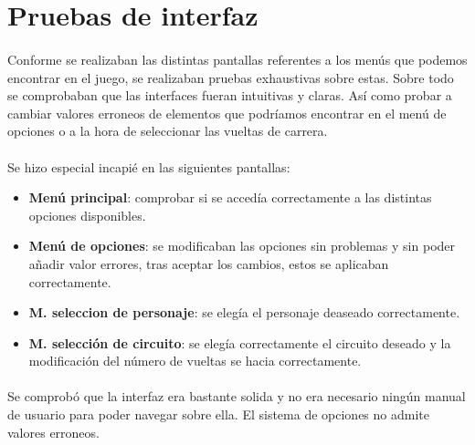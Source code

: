 \section{Pruebas de interfaz}

\paragraph{}
Conforme se realizaban las distintas pantallas referentes a los menús que podemos encontrar en el juego, se realizaban pruebas 
exhaustivas sobre estas. Sobre todo se comprobaban que las interfaces fueran intuitivas y claras. Así como probar a cambiar 
valores erroneos de elementos que podríamos encontrar en el menú de opciones o a la hora de seleccionar las vueltas de carrera.

\paragraph{}
Se hizo especial incapié en las siguientes pantallas:

\begin{itemize}
    \item \textbf{Menú principal}: comprobar si se accedía correctamente a las distintas opciones disponibles.
    
    \item \textbf{Menú de opciones}: se modificaban las opciones sin problemas y sin poder añadir valor errores, tras aceptar
    los cambios, estos se aplicaban correctamente.
    
    \item \textbf{M. seleccion de personaje}: se elegía el personaje deaseado correctamente.
    
    \item \textbf{M. selección de circuito}: se elegía correctamente el circuito deseado y la modificación del número de vueltas
    se hacia correctamente.
\end{itemize}

\paragraph{}
Se comprobó que la interfaz era bastante solida y no era necesario ningún manual de usuario para poder navegar sobre ella. El 
sistema de opciones no admite valores erroneos.
